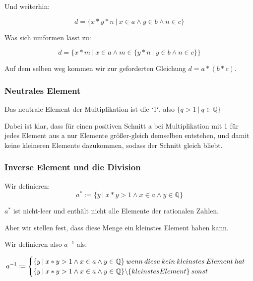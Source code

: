 \documentclass[12pt]{article}
\begin{document}
    Und weiterhin:

    \[d = \{x * y * n \mspace{4mu} | \mspace{4mu} x \in a \land y \in b \land n \in c\}\]

    Was sich umformen lässt zu:

    \[d = \{x * m \mspace{4mu} | \mspace{4mu} x \in a \land m \in \{y * n \mspace{4mu} | \mspace{4mu} y \in b \land n \in c\}\}\]

    Auf dem selben weg kommen wir zur geforderten Gleichung $d = a * (b * c)$.


    \subsubsection{Neutrales Element}

    Das neutrale Element der Multiplikation ist die `1`, also $\{q > 1 \mspace{4mu} | \mspace{4mu} q \in \mathbb{Q}\}$

    Dabei ist klar, dass für einen positiven Schnitt a bei Multiplikation mit 1 für jedes Element aus a nur Elemente
    größer-gleich demselben entstehen, und damit keine kleineren Elemente dazukommen, sodass der Schnitt gleich
    bliebt.

    \subsubsection{Inverse Element und die Division}

    Wir definieren:
    \[a^* := \{y \mspace{4mu} | \mspace{4mu} x * y > 1 \land x \in a \land y \in \mathbb{Q}\}\]

    $a^*$ ist nicht-leer und enthält nicht alle Elemente der rationalen Zahlen.

    Aber wir stellen fest, dass diese Menge ein kleinstes Element haben kann.

    Wir definieren also $a^{-1}$ als:

    \[
        a^{-1} \coloneqq
        \begin{cases}
            \{y \mspace{4mu} | \mspace{4mu} x * y > 1 \land x \in a \land y \in \mathbb{Q}\} \mspace{4mu} wenn
            \mspace{4mu} diese \mspace{4mu} kein \mspace{4mu} kleinstes \mspace{4mu} Element \mspace{4mu} hat \\
            \{y \mspace{4mu} | \mspace{4mu} x * y > 1 \land x \in a \land y \in \mathbb{Q}\} \symbol{'134} \{kleinstes Element\} \mspace{4mu} sonst
        \end{cases}
    \]
\end{document}
